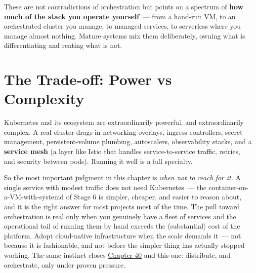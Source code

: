 \noindent{}These are not contradictions of orchestration but points on a spectrum of \textbf{how much of the stack you operate yourself}~--- from a hand-run VM, to an orchestrated cluster you manage, to managed services, to serverless where you manage almost nothing. Mature systems mix them deliberately, owning what is differentiating and renting what is not.

\setcounter{section}{4}
\section{The Trade-off: Power vs Complexity}\label{43-cloud-native-orchestration:435-the-trade-off-power-vs-complexity}

Kubernetes and its ecosystem are extraordinarily powerful, and extraordinarily complex. A real cluster drags in networking overlays, ingress controllers, secret management, persistent-volume plumbing, autoscalers, observability stacks, and a \textbf{service mesh} (a layer like Istio that handles service-to-service traffic, retries, and security between pods). Running it well is a full specialty.

So the most important judgment in this chapter is \emph{when not to reach for it.} A single service with modest traffic does not need Kubernetes~--- the container-on-a-VM-with-systemd of Stage 6 is simpler, cheaper, and easier to reason about, and it is the right answer for most projects most of the time. The pull toward orchestration is real only when you genuinely have a fleet of services and the operational toil of running them by hand exceeds the (substantial) cost of the platform. Adopt cloud-native infrastructure when the scale demands it~--- not because it is fashionable, and not before the simpler thing has actually stopped working. The same instinct closes \hyperref[ch:40-distributed-systems]{Chapter 40} and this one: distribute, and orchestrate, only under proven pressure.


